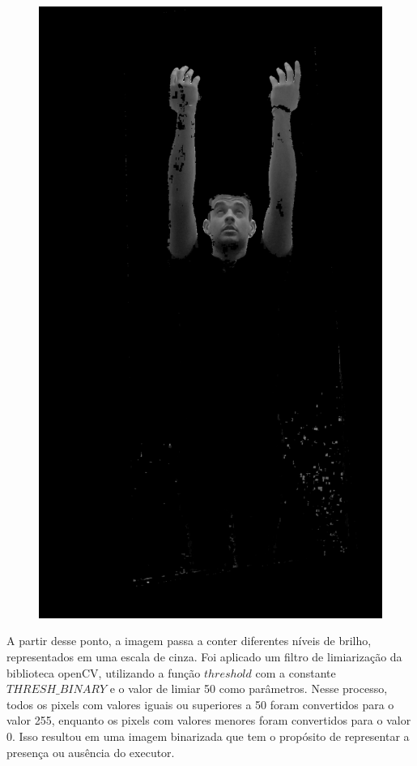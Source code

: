 \begin{figure}[H]
\begin{minipage}{\sizeImg\textwidth}
            \includegraphics[width=\textwidth]{figuras/mao_barra/gray.png}
        \end{minipage}
    \label{fig:gray}
\end{figure}

A partir desse ponto, a imagem passa a conter diferentes níveis de brilho, representados em uma escala de cinza. Foi aplicado um filtro de limiarização da biblioteca \ac{openCV}, utilizando a função $threshold$ com a constante $THRESH\_BINARY$ e o valor de limiar 50 como parâmetros. Nesse processo, todos os pixels com valores iguais ou superiores a 50 foram convertidos para o valor 255, enquanto os pixels com valores menores foram convertidos para o valor 0. Isso resultou em uma imagem binarizada que tem o propósito de representar a presença ou ausência do executor.

